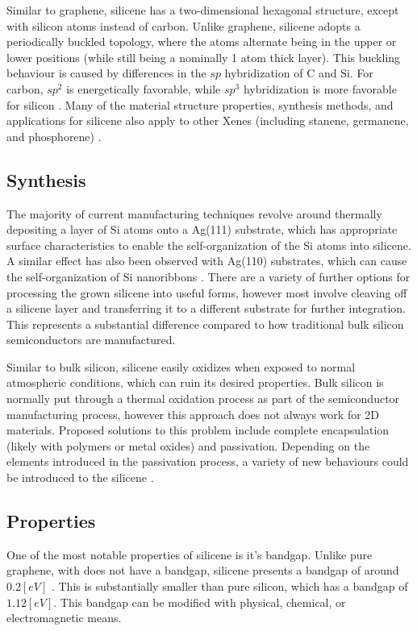 \documentclass[conference]{IEEEtran}
\begin{document}
Similar to graphene, silicene has a two-dimensional hexagonal structure, except with silicon atoms instead of carbon. Unlike graphene, silicene adopts a periodically buckled topology, where the atoms alternate being in the upper or lower positions (while still being a nominally 1 atom thick layer). This buckling behaviour is caused by differences in the $sp$ hybridization of C and Si. For carbon, $sp^2$ is energetically favorable, while $sp^3$ hybridization is more favorable for silicon \cite{oc1}. Many of the material structure properties, synthesis methods, and applications for silicene also apply to other Xenes (including stanene, germanene, and phosphorene) \cite{oc2}.

\subsection{Synthesis}

The majority of current manufacturing techniques revolve around thermally depositing a layer of Si atoms onto a Ag(111) substrate, which has appropriate surface characteristics to enable the self-organization of the Si atoms into silicene. A similar effect has also been observed with Ag(110) substrates, which can cause the self-organization of Si nanoribbons \cite{oc3, oc1}. There are a variety of further options for processing the grown silicene into useful forms, however most involve cleaving off a silicene layer and transferring it to a different substrate for further integration. This represents a substantial difference compared to how traditional bulk silicon semiconductors are manufactured.

Similar to bulk silicon, silicene easily oxidizes when exposed to normal atmospheric conditions, which can ruin its desired properties. Bulk silicon is normally put through a thermal oxidation process as part of the semiconductor manufacturing process, however this approach does not always work for 2D materials. Proposed solutions to this problem include complete encapsulation (likely with polymers or metal oxides) and passivation. Depending on the elements introduced in the passivation process, a variety of new behaviours could be introduced to the silicene \cite{oc2}.

\subsection{Properties}

One of the most notable properties of silicene is it's bandgap. Unlike pure graphene, with does not have a bandgap, silicene presents a bandgap of around $0.2[\si{eV}]$ \cite{oc2}. This is substantially smaller than pure silicon, which has a bandgap of $1.12[\si{eV}]$. This bandgap can be modified with physical, chemical, or electromagnetic means.
\end{document}
